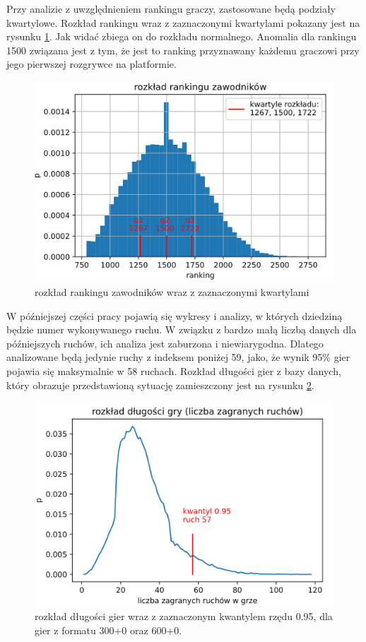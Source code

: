 \documentclass[inzynierska]{pwr_wmat_praca_dyplomowa}
\theoremstyle{plain}
\numberwithin{theorem}{chapter}
\theoremstyle{definition}
\numberwithin{theorem}{chapter}
\begin{document}
Przy analizie z uwzględnieniem rankingu graczy, zastosowane będą podziały kwartylowe. Rozkład rankingu wraz z zaznaczonymi kwartylami pokazany jest na rysunku \ref{rys:rozklad_elo}. Jak widać zbiega on do rozkładu normalnego. Anomalia dla rankingu 1500 związana jest z tym, że jest to ranking przyznawany każdemu graczowi przy jego pierwszej rozgrywce na platformie.
\begin{figure}[H]
	\centering
	\includegraphics[width=\textwidth]{ranking.png}
	\caption{rozkład rankingu zawodników wraz z zaznaczonymi kwartylami}
	\label{rys:rozklad_elo}
\end{figure}
W późniejszej części pracy pojawią się wykresy i analizy, w których dziedziną będzie numer wykonywanego ruchu. W związku z bardzo małą liczbą danych dla późniejszych ruchów, ich analiza jest zaburzona i niewiarygodna. Dlatego analizowane będą jedynie ruchy z indeksem poniżej 59, jako, że wynik 95\% gier pojawia się maksymalnie w 58 ruchach. Rozkład długości gier z bazy danych, który obrazuje przedstawioną sytuację zamieszczony jest na rysunku \ref{rys:dlugosc_gier}.

\begin{figure}[H]
	\centering
	\includegraphics[width=\textwidth]{dlugosc_gry.png}
	\caption{rozkład długości gier wraz z zaznaczonym kwantylem rzędu 0.95,  dla gier z formatu 300+0 oraz 600+0.}
	\label{rys:dlugosc_gier}
\end{figure}
\end{document}
